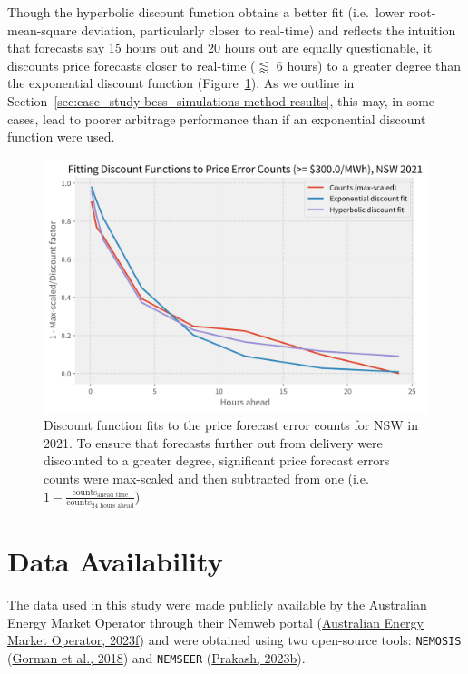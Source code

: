\documentclass[12pt,a4paper,]{report}
\begin{document}
Though the hyperbolic discount function obtains a better fit (i.e.~lower
root-mean-square deviation, particularly closer to real-time) and
reflects the intuition that forecasts say 15 hours out and 20 hours out
are equally questionable, it discounts price forecasts closer to
real-time (\(\lessapprox\) 6 hours) to a greater degree than the
exponential discount function
(Figure~\ref{fig:discount_function_fitting}). As we outline in
Section~\ref{sec:case_study-bess_simulations-method-results}, this may,
in some cases, lead to poorer arbitrage performance than if an
exponential discount function were used.

\begin{figure}
\hypertarget{fig:discount_function_fitting}{%
\centering
\includegraphics{source/figures/curve_fits_300.0.png}
\caption{Discount function fits to the price forecast error counts for
NSW in 2021. To ensure that forecasts further out from delivery were
discounted to a greater degree, significant price forecast errors counts
were max-scaled and then subtracted from one
(i.e.~\(1-\frac{\textrm{counts}_{\textrm{ahead time}}}{\textrm{counts}_{\textrm{24 hours ahead}}}\))}\label{fig:discount_function_fitting}
}
\end{figure}

\hypertarget{data-availability}{%
\section*{Data Availability}\label{data-availability}}

The data used in this study were made publicly available by the
Australian Energy Market Operator through their Nemweb portal
(\protect\hyperlink{ref-australianenergymarketoperatorNemwebMarketData2023}{Australian
Energy Market Operator, 2023f}) and were obtained using two open-source
tools: \texttt{NEMOSIS}
(\protect\hyperlink{ref-gormanNEMOSISNEMOpen2018}{Gorman et al., 2018})
and \texttt{NEMSEER}
(\protect\hyperlink{ref-prakashNEMSEER2023}{Prakash, 2023b}).
\end{document}
